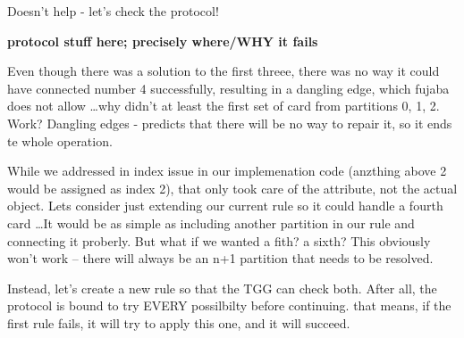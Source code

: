 Doesn't help - let's check the protocol!


{\bf protocol stuff here; precisely where/WHY it fails}

Even though there was a solution to the first threee, there was no way it could have connected number 4 successfully, resulting
in a dangling edge, which fujaba does not allow \ldots why didn't at least the first set of card from partitions 0, 1, 2. Work? Dangling edges - predicts that there
will be no way to repair it, so it ends te whole operation.

While we addressed in index issue in our implemenation code (anzthing above 2 would be assigned as index 2), that only took care of the attribute, not the
actual object. Lets consider just extending our current rule so it could handle a fourth card \ldots It would be as simple as including
another partition in our rule and connecting it proberly. But what if we wanted a fith? a sixth?  This obviously won't work -- there will always be an n+1
partition that needs to be resolved.

Instead, let's create a new rule so that the TGG can check both. After all, the protocol is bound to try EVERY possilbilty before continuing. that means, if
the first rule fails, it will try to apply this one, and it will succeed.








